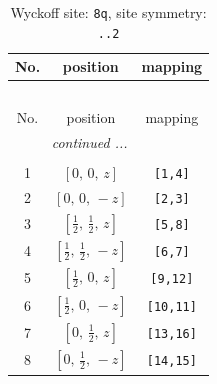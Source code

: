 \documentclass[fleqn,8pt]{jsarticle}
\begin{document}
\begin{longtable}{ccc}
\caption{Wyckoff site: {\tt 8q}, site symmetry: {\tt ..2}}
 \\
 \hline \hline
No. & position & mapping \\ \hline \endfirsthead

\multicolumn{2}{l}{\tablename\ \thetable{}} \\
 \hline \hline
No. & position & mapping \\ \hline \endhead

 \hline \hline
\multicolumn{2}{r}{\footnotesize\it continued ...} \\ \endfoot

 \hline \hline
\multicolumn{2}{r}{} \\ \endlastfoot

1 & $\left[ 0,\, 0,\, z \right]$ & {\tt [1,4]} \\ \hline
2 & $\left[ 0,\, 0,\, - z \right]$ & {\tt [2,3]} \\ \hline
3 & $\left[ \frac{1}{2},\, \frac{1}{2},\, z \right]$ & {\tt [5,8]} \\ \hline
4 & $\left[ \frac{1}{2},\, \frac{1}{2},\, - z \right]$ & {\tt [6,7]} \\ \hline
5 & $\left[ \frac{1}{2},\, 0,\, z \right]$ & {\tt [9,12]} \\ \hline
6 & $\left[ \frac{1}{2},\, 0,\, - z \right]$ & {\tt [10,11]} \\ \hline
7 & $\left[ 0,\, \frac{1}{2},\, z \right]$ & {\tt [13,16]} \\ \hline
8 & $\left[ 0,\, \frac{1}{2},\, - z \right]$ & {\tt [14,15]} \\
\end{longtable}
\renewcommand{\arraystretch}{1.2}
\end{document}
